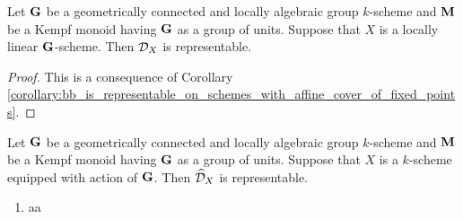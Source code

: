 \begin{corollary}\label{corollary:bb_is_representable_on_locally_linear_schemes}
Let $\mathbf{G}$ be a geometrically connected and locally algebraic group $k$-scheme and $\mathbf{M}$ be a Kempf monoid having $\mathbf{G}$ as a group of units. Suppose that $X$ is a locally linear $\mathbf{G}$-scheme. Then ${\mathcal D}_X$ is representable.
\end{corollary}
\begin{proof}
This is a consequence of Corollary \ref{corollary:bb_is_representable_on_schemes_with_affine_cover_of_fixed_points}.
\end{proof}

\begin{theorem}
Let $\mathbf{G}$ be a geometrically connected and locally algebraic group $k$-scheme and $\mathbf{M}$ be a Kempf monoid having $\mathbf{G}$ as a group of units. Suppose that $X$ is a $k$-scheme equipped with action of $\mathbf{G}$. Then $\widehat{{\mathcal D}}_X$ is representable.
\begin{enumerate}[label=\textbf{\emph{(\arabic*)}}, leftmargin=3.0em]
\item aa
\end{enumerate}
\end{theorem}






































































\small




